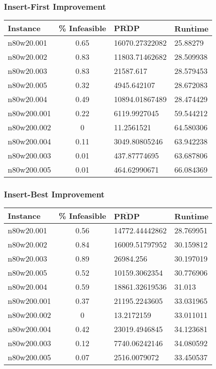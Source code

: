 \begin{homeworkProblem}
\subsubsection{Insert-First Improvement}
\begin{center}
\begin{tabular}{|l|c|l|l|}
\hline
\textbf{Instance}& \textbf{\% Infeasible} & $\mathbf{\bar{PRDP}}$ &$\mathbf{\bar{Runtime}}$\\
\hline
n80w20.001&0.65&16070.27322082&25.88279\\
\hline
n80w20.002&0.83&11803.71462682&28.509938\\
\hline
n80w20.003&0.83&21587.617&28.579453\\
\hline
n80w20.005&0.32&4945.642107&28.672083\\
\hline
n80w20.004&0.49&10894.01867489&28.474429\\
\hline
n80w200.001&0.22&6119.9927045&59.544212\\
\hline
n80w200.002&0&11.2561521&64.580306\\
\hline
n80w200.004&0.11&3049.80805246&63.942238\\
\hline
n80w200.003&0.01&437.87774695&63.687806\\
\hline
n80w200.005&0.01&464.62990671&66.084369\\
\hline

\end{tabular}
\end{center}

\subsubsection{Insert-Best Improvement}
\begin{center}
\begin{tabular}{|l|c|l|l|}
\hline
\textbf{Instance}& \textbf{\% Infeasible} & $\mathbf{\bar{PRDP}}$ &$\mathbf{\bar{Runtime}}$\\
\hline
n80w20.001&0.56&14772.44442862&28.769951\\
\hline
n80w20.002&0.84&16009.51797952&30.159812\\
\hline
n80w20.003&0.89&26984.256&30.197019\\
\hline
n80w20.005&0.52&10159.3062354&30.776906\\
\hline
n80w20.004&0.59&18861.32619536&31.013\\
\hline
n80w200.001&0.37&21195.2243605&33.031965\\
\hline
n80w200.002&0&13.2172159&33.011011\\
\hline
n80w200.004&0.42&23019.4946845&34.123681\\
\hline
n80w200.003&0.12&7740.06242146&34.080592\\
\hline
n80w200.005&0.07&2516.0079072&33.450537\\
\hline
\end{tabular}
\end{center}

\end{homeworkProblem}		
